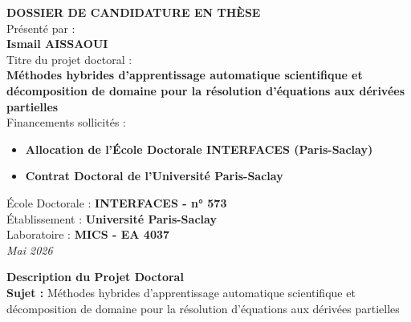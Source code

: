 \documentclass[a4paper,11pt]{article}
\begin{document}
\begin{titlepage}
    \begin{center}
        \vspace*{2cm}
        {\Huge\bfseries\color{titlesaclay} DOSSIER DE CANDIDATURE EN THÈSE}\\[2cm]
        
        {\Large Présenté par :}\\[0.5cm]
        {\huge\bfseries Ismail AISSAOUI}\\[2cm]
        
        {\Large Titre du projet doctoral :}\\[0.5cm]
        {\Large\bfseries Méthodes hybrides d’apprentissage automatique scientifique et décomposition de domaine pour la résolution d’équations aux dérivées partielles}\\[2cm]
        
        {\Large Financements sollicités :}\\[0.5cm]
        \begin{itemize}[label=--]
            \item[] \textbf{Allocation de l'École Doctorale INTERFACES (Paris-Saclay)}
            \item[] \textbf{Contrat Doctoral de l'Université Paris-Saclay}
        \end{itemize}

        \vfill
        
        {\Large École Doctorale : \textbf{INTERFACES - n° 573}}\\[0.3cm]
        {\Large Établissement : \textbf{Université Paris-Saclay}}\\[0.3cm]
        {\Large Laboratoire : \textbf{MICS - EA 4037}}\\[2cm]
        
        \textit{Mai 2026}
    \end{center}
\end{titlepage}

\newpage

\begin{center}
    {\Large\bfseries Description du Projet Doctoral}\\[10pt]
    \textbf{Sujet :} Méthodes hybrides d’apprentissage automatique scientifique et décomposition de domaine pour la résolution d’équations aux dérivées partielles
\end{center}
\end{document}
